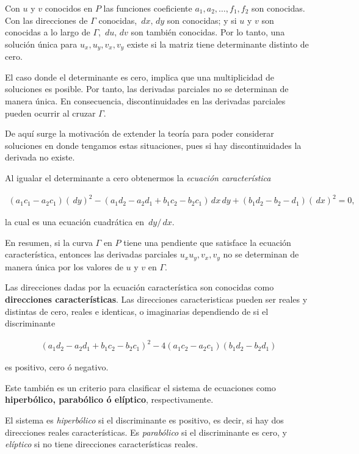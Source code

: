 Con $u$ y $v$ conocidos en $P$ las funciones coeficiente $a_1, a_2, \dots, f_1, f_2$ son conocidas. Con las direcciones de $\Gamma$ conocidas, $\,dx, \,dy$ son conocidas; y si $u$ y $v$ son conocidas a lo largo de $\Gamma$, $\,du, \,dv$ son también conocidas. Por lo tanto, una solución única para $u_x, u_y, v_x, v_y$ existe si la matriz tiene determinante distinto de cero.

El caso donde el determinante es cero, implica que una multiplicidad de soluciones es posible. Por tanto, las derivadas parciales no se determinan de manera única. En consecuencia, discontinuidades en las derivadas parciales pueden ocurrir al cruzar $\Gamma$.

De aquí surge la motivación de extender la teoría para poder considerar soluciones en donde tengamos estas situaciones, pues si hay discontinuidades la derivada no existe.

Al igualar el determinante a cero obtenermos la \textit{ecuación característica}

\begin{align*}
(a_1 c_1 - a_2 c_1)(\,dy)^2 - (a_1d_2 - a_2d_1 + b_1c_2 - b_2c_1) \,dx \,dy
+ (b_1d_2 - b_2-d_1) (\,dx)^2 = 0,
\end{align*}

la cual es una ecuación cuadrática en $\,dy/\,dx$. 

En resumen, si la curva $\Gamma$ en $P$ tiene una pendiente que satisface la ecuación característica, entonces las derivadas parciales $u_x u_y, v_x, v_y$ no se determinan de manera única por los valores de $u$ y $v$ en $\Gamma$. 

Las direcciones dadas por la ecuación característica son conocidas como \textbf{direcciones características}. Las direcciones caracteristicas pueden ser reales y distintas de cero, reales e identicas, o imaginarias dependiendo de si el discriminante

\begin{align*}
(a_1d_2 - a_2d_1 + b_1c_2 - b_2c_1)^2 - 4(a_1c_2 - a_2 c_1)(b_1d_2 - b_2 d_1)
\end{align*}

es positivo, cero ó negativo.

Este también es un criterio para clasificar el sistema de ecuaciones como \textbf{hiperbólico, parabólico ó elíptico}, respectivamente.

El sistema es \textit{hiperbólico} si el discriminante es positivo, es decir, si hay dos direcciones reales características. Es \textit{parabólico} si el discriminante es cero, y \textit{elíptico} si no tiene direcciones características reales.

